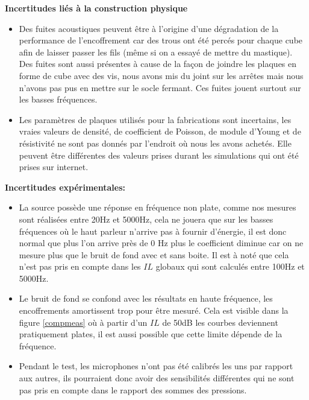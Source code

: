 \documentclass[12pt,foolscap]{report}
\begin{document}
	\textbf{Incertitudes liés à la construction physique}\\
	\begin{itemize}[label=\textbullet]
		\item Des fuites acoustiques peuvent être à l'origine d'une dégradation de la performance de l'encoffrement car des trous ont été percés pour chaque cube  afin de laisser passer les fils (même si on a essayé de mettre du mastique). Des fuites sont aussi présentes à cause de la façon de joindre les plaques en forme de cube avec des vis, nous avons mis du joint sur les arrêtes mais nous n'avons pas pus en mettre sur le socle fermant. Ces fuites jouent surtout sur les basses fréquences. \\ 
		\item Les paramètres de plaques utilisés pour la fabrications sont incertains, les vraies valeurs de densité, de coefficient de Poisson, de module d'Young et de résistivité  ne sont pas donnés par l'endroit où nous les avons achetés. Elle peuvent être différentes des valeurs prises durant les simulations qui ont été prises sur internet.\\
	\end{itemize}
	
	\textbf{ Incertitudes expérimentales:}\\
	\begin{itemize}[label=\textbullet]
		\item La source possède une réponse en fréquence non plate, comme nos mesures sont réalisées entre 20Hz et 5000Hz, cela ne jouera que sur les basses fréquences où le haut parleur n'arrive pas à fournir d'énergie, il est donc normal que plus l'on arrive près de 0 Hz plus le coefficient diminue car on ne mesure plus que le bruit de fond avec et sans boite. Il est à noté que cela n'est pas pris en compte dans les $IL$ globaux qui sont calculés entre 100Hz et 5000Hz. \\
		\item Le bruit de fond se confond avec les résultats en haute fréquence, les encoffrements amortissent trop pour être mesuré. Cela est visible dans la figure \ref{compmeas} où à partir d'un $IL$ de 50dB les courbes deviennent pratiquement plates, il est aussi possible que cette limite dépende de la fréquence.\\
		\item   Pendant le test, les microphones n'ont pas été calibrés les uns par rapport aux autres, ils pourraient donc avoir des sensibilités différentes qui ne sont pas pris en compte dans le rapport des sommes des pressions. \\ 
	\end{itemize}
	
\end{document}
